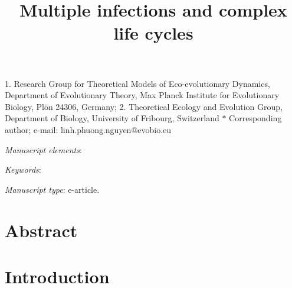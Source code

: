 \documentclass[11pt]{article}
\title{Multiple infections and complex life cycles}
\author{}
\date{}
\begin{document}
\maketitle

\noindent{} 1. Research Group for Theoretical Models of Eco-evolutionary Dynamics, Department of Evolutionary Theory, Max Planck Institute for Evolutionary Biology, Pl\"{o}n 24306, Germany;
%
\noindent{} 2. Theoretical Ecology and Evolution Group, Department of Biology, University of Fribourg, Switzerland
%
\noindent{} $\ast$ Corresponding author; e-mail: linh.phuong.nguyen@evobio.eu

\bigskip

\textit{Manuscript elements}: %

\bigskip

\textit{Keywords}: 

\bigskip

\textit{Manuscript type}: e-article. %

\bigskip



\newpage{}

\section*{Abstract}



\newpage{}

\section*{Introduction}

\end{document}
